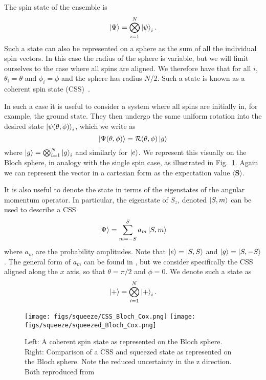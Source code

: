 The spin state of the ensemble is
%
\begin{equation}
  \ket{\Psi} = \bigotimes_{i=1}^N \ket{\psi}_i.
\end{equation}
%
Such a state can also be represented on a sphere as the sum of all the
individual spin vectors. In this case the radius of the sphere is variable, but
we will limit ourselves to the case where 
all spins are aligned.
We therefore have that for all $i$, $\theta_i = \theta$ and $\phi_i = \phi$ and the
sphere has radius $N/2$. Such a state is known as a coherent spin state
(CSS)~\cite{MA201189, Gazeau2009}.

In such a case it is useful to consider a system where
all spins are initially in, for example, the ground state. They then undergo
the same uniform rotation into the desired state $\ket{\psi(\theta, \phi)}_i$,
which we write as
%
\begin{equation}
  \ket{\Psi(\theta,\phi)} = \mathcal{R}(\theta, \phi)\ket{g}
\end{equation}
%
where $\ket{g} = \bigotimes_{i=1}^N\ket{g}_i$ and similarly for $\ket{e}$. We
represent this visually on the Bloch sphere, in analogy with the single spin
case, as illustrated in Fig.~\ref{CSSbloch}. Again we can represent the vector
in a cartesian form as the expectation value $\langle \mathbf{S} \rangle$. 


It is also useful to denote the state in terms of the
eigenstates of the angular momentum operator. In particular, the eigenstate of
$S_z$, denoted $\ket{S, m}$ can be used to describe a CSS
%
\begin{equation}
  \ket{\Psi} = \sum_{m=-S}^S a_m \ket{S, m}
\end{equation}
where $a_m$ are the probability amplitudes. Note that $\ket{e} = \ket{S, S}$
and $\ket{g} = \ket{S, -S}$.
%
The general form of $a_m$ can be found in , but we
consider specifically the CSS aligned along the $x$ axis, so that $\theta =
\pi/2$ and $\phi = 0$. We denote such a state as
%
\begin{equation}
  \ket{+} = \bigotimes_{i=1}^N \ket{+}_i.
\end{equation}

\begin{figure}
  \centering
  \texttt{[image: figs/squeeze/CSS\_Bloch\_Cox.png]}
  \texttt{[image: figs/squeeze/squeezed\_Bloch\_Cox.png]}
  \caption{Left: A coherent spin state as represented on the Bloch sphere.
  Right: Comparison of a CSS and squeezed state as represented on the Bloch
  sphere. Note the reduced uncertainty in the z direction.
  Both reproduced from~\cite{Cox2016}}
  \label{CSSbloch}
\end{figure}

